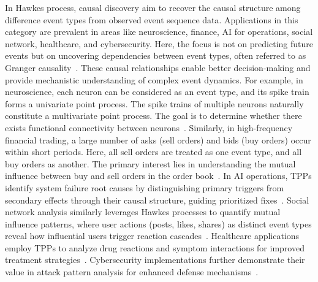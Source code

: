 \documentclass[10pt]{article} %
\begin{document}
In Hawkes process, causal discovery aim to recover the causal structure among difference event types from observed event sequence data. Applications in this category are prevalent in areas like neuroscience, finance, AI for operations, social network, healthcare, and cybersecurity. Here, the focus is not on predicting future events but on uncovering dependencies between event types, often referred to as Granger causality~\citep{granger1969investigating}. These causal relationships enable better decision-making and provide mechanistic understanding of complex event dynamics.
For example, in neuroscience, each neuron can be considered as an event type, and its spike train forms a univariate point process. The spike trains of multiple neurons naturally constitute a multivariate point process. The goal is to determine whether there exists functional connectivity between neurons~\citep{linderman2015scalable,zhou2022efficient}. 
Similarly, in high-frequency financial trading, a large number of asks (sell orders) and bids (buy orders) occur within short periods. Here, all sell orders are treated as one event type, and all buy orders as another. The primary interest lies in understanding the mutual influence between buy and sell orders in the order book~\citep{bacry2014hawkes}. 
In AI operations, TPPs identify system failure root causes by distinguishing primary triggers from secondary effects through their causal structure, guiding prioritized fixes~\citep{cai2022thps}. Social network analysis similarly leverages Hawkes processes to quantify mutual influence patterns, where user actions (posts, likes, shares) as distinct event types reveal how influential users trigger reaction cascades~\citep{zhou2013learningsocial}. Healthcare applications employ TPPs to analyze drug reactions and symptom interactions for improved treatment strategies~\citep{bao2017hawkes}. Cybersecurity implementations further demonstrate their value in attack pattern analysis for enhanced defense mechanisms~\citep{Bessy-Roland_Boumezoued_Hillairet_2021,fortino2022neural}.
\end{document}
